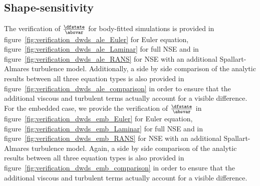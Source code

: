 \documentclass[../main.tex]{subfiles}
\begin{document}
\FloatBarrier



\subsection{Shape-sensitivity}
The verification of $\tfrac{\dfstate}{\absvar}$ for body-fitted simulations is provided in figure~\ref{fig:verification_dwds_ale_Euler} for Euler equation, figure~\ref{fig:verification_dwds_ale_Laminar} for full \ac{NSE} and in figure~\ref{fig:verification_dwds_ale_RANS} for \ac{NSE} with an additional Spallart-Almares turbulence model.
Additionally, a side by side comparison of the analytic results between all three equation types is also provided in figure~\ref{fig:verification_dwds_ale_comparison} in order to ensure that the additional viscous and turbulent terms actually account for a visible difference.
\\
For the embedded case, we provide the verification of $\tfrac{\dfstate}{\absvar}$  in figure~\ref{fig:verification_dwds_emb_Euler} for Euler equation, figure~\ref{fig:verification_dwds_emb_Laminar} for full \ac{NSE} and in figure~\ref{fig:verification_dwds_emb_RANS} for \ac{NSE} with an additional Spallart-Almares turbulence model.
Again, a side by side comparison of the analytic results between all three equation types is also provided in figure~\ref{fig:verification_dwds_emb_comparison} in order to ensure that the additional viscous and turbulent terms actually account for a visible difference.
\end{document}
